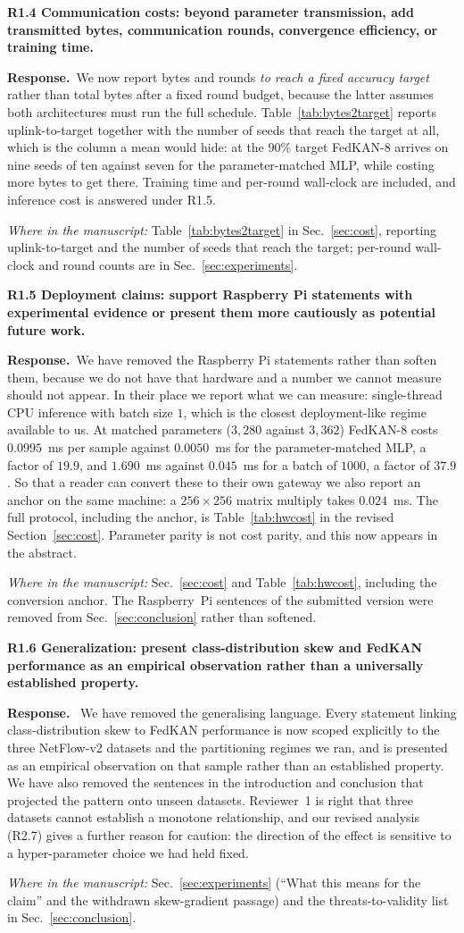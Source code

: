\documentclass[11pt]{article}
\newcommand{\rc}[1]{\medskip\noindent\textbf{\textcolor[rgb]{0.35,0.35,0.35}{#1}}\par\nopagebreak}
\newcommand{\reply}{\medskip\noindent\textbf{Response.}\ }
\newcommand{\where}[1]{\par\smallskip\noindent\emph{Where in the manuscript:} #1\par}
\begin{document}
\rc{R1.4 Communication costs: beyond parameter transmission, add transmitted bytes,
communication rounds, convergence efficiency, or training time.}
\reply We now report bytes and rounds \emph{to reach a fixed accuracy target} rather than total bytes
after a fixed round budget, because the latter assumes both architectures must run the full
schedule. Table~\ref{tab:bytes2target} reports uplink-to-target together with the number of seeds that reach the target at all, which is the column a mean would hide: at the $90\%$ target FedKAN-8 arrives on nine seeds of ten against seven for the parameter-matched MLP, while costing more bytes to get there. Training time and
per-round wall-clock are included, and inference cost is answered under R1.5.
\where{Table~\ref{tab:bytes2target} in Sec.~\ref{sec:cost}, reporting uplink-to-target and the number of seeds that reach the target; per-round wall-clock and round counts are in Sec.~\ref{sec:experiments}.}

\rc{R1.5 Deployment claims: support Raspberry Pi statements with experimental evidence
or present them more cautiously as potential future work.}
\reply We have removed the Raspberry Pi statements rather than soften them, because we do not have
that hardware and a number we cannot measure should not appear. In their place we report what
we can measure: single-thread CPU inference with batch size $1$, which is the closest
deployment-like regime available to us. At matched parameters ($3{,}280$ against $3{,}362$)
FedKAN-8 costs $0.0995$~ms per sample against $0.0050$~ms for the parameter-matched MLP, a
factor of $19.9$, and $1.690$~ms against $0.045$~ms for a batch of $1000$, a factor of $37.9$.
So that a reader can convert these to their own gateway we also report an anchor on the same machine: a $256\times256$ matrix multiply takes $0.024$~ms. The full protocol, including the anchor, is Table~\ref{tab:hwcost} in the revised Section~\ref{sec:cost}. Parameter parity is not cost
parity, and this now appears in the abstract.
\where{Sec.~\ref{sec:cost} and Table~\ref{tab:hwcost}, including the conversion anchor. The Raspberry~Pi sentences of the submitted version were removed from Sec.~\ref{sec:conclusion} rather than softened.}

\rc{R1.6 Generalization: present class-distribution skew and FedKAN performance as an
empirical observation rather than a universally established property.}
\reply 
We have removed the generalising language. Every statement linking class-distribution skew
to FedKAN performance is now scoped explicitly to the three NetFlow-v2 datasets and the
partitioning regimes we ran, and is presented as an empirical observation on that sample
rather than an established property. We have also removed the sentences in the
introduction and conclusion that projected the pattern onto unseen datasets. Reviewer~1 is
right that three datasets cannot establish a monotone relationship, and our revised
analysis (R2.7) gives a further reason for caution: the direction of the effect is
sensitive to a hyper-parameter choice we had held fixed.
\where{Sec.~\ref{sec:experiments} (``What this means for the claim'' and the withdrawn skew-gradient passage) and the threats-to-validity list in Sec.~\ref{sec:conclusion}.}
\end{document}
